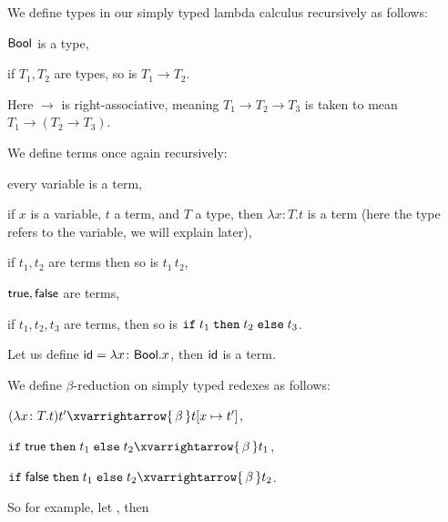 \bdefn

    We define {\emphcolor types} in our simply typed lambda calculus recursively as follows:
    \benum
        \item ${\sf Bool}$ is a type,
        \item if $T_1,T_2$ are types, so is $T_1\to T_2$.
    \eenum

\edefn

Here $\to$ is right-associative, meaning $T_1\to T_2\to T_3$ is taken to mean $T_1\to(T_2\to T_3)$.

\bdefn

    We define terms once again recursively:
    \benum
        \item every variable is a term,
        \item if $x$ is a variable, $t$ a term, and $T$ a type, then $\lambda x\colon T.t$ is a term (here the type refers to the variable, we will explain later),
        \item if $t_1,t_2$ are terms then so is $t_1\,t_2$,
        \item ${\sf true},{\sf false}$ are terms,
        \item if $t_1,t_2,t_3$ are terms, then so is ${\tt if\;}t_1{\tt\;then\;}t_2{\tt\;else\;}t_3$.
    \eenum

\edefn

Let us define $\id=\lambda x\colon{\sf Bool}.x$, then ${\sf id}$ is a term.

\bdefn

    We define $\beta$-reduction on simply typed redexes as follows:
    \benum
        \item $(\lambda x\colon T.t)t'\xvarrightarrow{\,\beta\,}t[x\mapsto t']$,
        \item ${\tt if\;}{\sf true}{\tt\;then\;}t_1{\tt\;else\;}t_2\xvarrightarrow{\,\beta\,}t_1$,
        \item ${\tt if\;}{\sf false}{\tt\;then\;}t_1{\tt\;else\;}t_2\xvarrightarrow{\,\beta\,}t_2$.
    \eenum

\edefn

So for example, let , then


